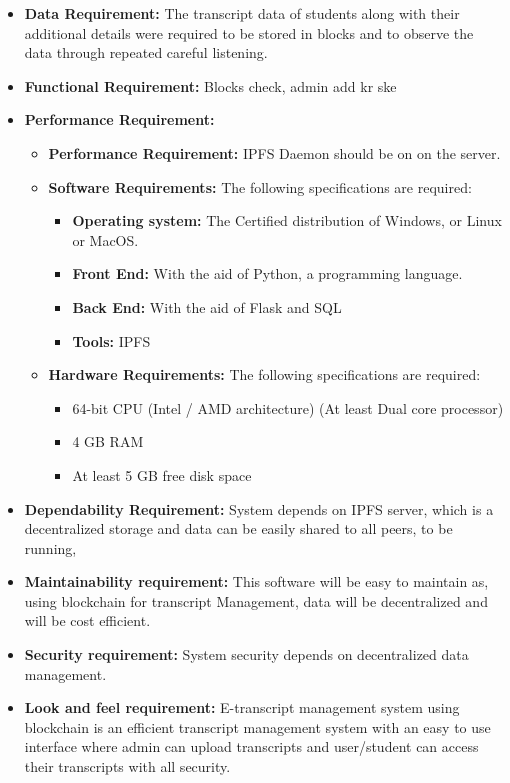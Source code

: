 \begin{itemize}
    \item \textbf{Data Requirement: } The transcript data of students along with their additional details were required to be stored in blocks and to observe the data through repeated careful listening.
    \item \textbf{Functional Requirement: } Blocks check, admin add kr ske
    \item \textbf{Performance Requirement: } 
        \begin{itemize}
        \item \textbf{Performance Requirement: } IPFS Daemon should be on on the server.
        \item \textbf{Software Requirements:} The following specifications are required:
        \begin{itemize}
            \item \textbf{Operating system:} The Certified distribution of Windows, or Linux or MacOS.
            \item \textbf{Front End:} With the aid of Python, a programming language.
            \item \textbf{Back End:} With the aid of Flask and SQL
            \item \textbf{Tools: } IPFS
        \end{itemize} 
        \item \textbf{Hardware Requirements:} The following specifications are required:
        \begin{itemize}
            \item 64-bit  CPU (Intel / AMD architecture) (At least Dual core processor)
            \item 4 GB RAM
            \item At least 5 GB free disk space
        \end{itemize} 
    \end{itemize}
    \item \textbf{Dependability Requirement: } System depends on IPFS server, which is a decentralized storage and data can be easily shared to all peers, to be running, 
    \item \textbf{Maintainability requirement: } This software will be easy to maintain as, using blockchain for transcript Management, data will be decentralized and will be cost efficient.
    \item \textbf{Security requirement: } System security depends on decentralized data management.
    \item \textbf{Look and feel requirement: } E-transcript management system using blockchain is an efficient transcript management system with an easy to use interface where admin can upload transcripts and user/student can access their transcripts with all security. 
\end{itemize}


